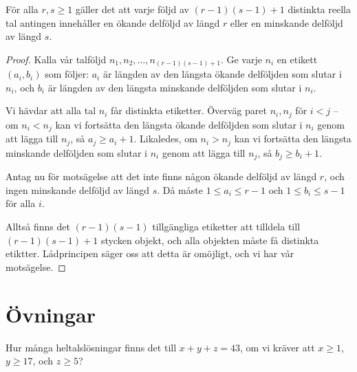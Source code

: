 \documentclass[nobib]{tufte-handout}
\begin{document}
\begin{theorem}
  För alla $r,s \geq 1$ gäller det att varje följd av $(r-1)(s-1) + 1$ distinkta reella tal antingen innehåller en ökande delföljd av längd $r$ eller en minskande delföljd av längd $s$.

  \begin{proof}
    Kalla vår talföljd $n_1, n_2, \ldots, n_{(r-1)(s-1)+1}$. Ge varje $n_i$ en etikett $(a_i, b_i)$ som följer: $a_i$ är längden av den längsta ökande delföljden som slutar i $n_i$, och $b_i$ är längden av den längsta minskande delföljden som slutar i $n_i$.

    Vi hävdar att alla tal $n_i$ får distinkta etiketter. Överväg paret $n_i, n_j$ för $i < j$ -- om $n_i < n_j$ kan vi fortsätta den längsta ökande delföljden som slutar i $n_i$ genom att lägga till $n_j$, så $a_j \geq a_i + 1$. Likaledes, om $n_i > n_j$ kan vi fortsätta den längsta minskande delföljden som slutar i $n_i$ genom att lägga till $n_j$, så $b_j \geq b_i + 1$.

    Antag nu för motsägelse att det inte finns någon ökande delföljd av längd $r$, och ingen minskande delföljd av längd $s$. Då måste $1 \leq a_i \leq r-1$ och $1\leq b_i \leq s-1$ för alla $i$.

    Alltså finns det $(r-1)(s-1)$ tillgängliga etiketter att tilldela till $(r-1)(s-1) + 1$ stycken objekt, och alla objekten måste få distinkta etiktter. Lådprincipen säger oss att detta är omöjligt, och vi har vår motsägelse.
  \end{proof}
\end{theorem}


\newpage

\section{Övningar}

\begin{xca}
  Hur många heltalslösningar finns det till $x + y + z = 43$, om vi kräver att $x \geq 1$, $y \geq 17$, och $z \geq 5$?
\end{xca}
\end{document}
